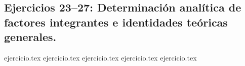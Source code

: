 \subsection*{Ejercicios 23--27: Determinación analítica de factores integrantes e identidades teóricas generales.}
\begin{enumerate}
    \setcounter{enumi}{22}
    {ejercicio.tex}
    {ejercicio.tex}
    {ejercicio.tex}
    {ejercicio.tex}
    {ejercicio.tex}
\end{enumerate}
